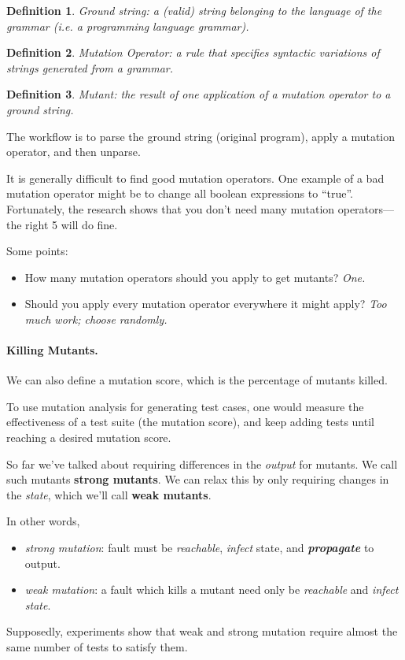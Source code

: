 \documentclass[11pt]{article}
\newtheorem{defn}{Definition}
\begin{document}
\begin{defn}
Ground string: a (valid) string belonging to the language of the grammar (i.e. 
a programming language grammar).
\end{defn}

\begin{defn}
Mutation Operator: a rule that specifies syntactic variations of
strings generated from a grammar.
\end{defn}

\begin{defn}
Mutant: the result of one application of a mutation operator to a 
ground string.
\end{defn}

The workflow is to parse the ground string (original program), apply a
mutation operator, and then unparse.

It is generally difficult to find good mutation operators. One example
of a bad mutation operator might be to change all boolean expressions to
``true''. Fortunately, the research shows that you don't need many
mutation operators---the right 5 will do fine.

Some points:
\begin{itemize}[noitemsep]
\item How many mutation operators should you apply to get mutants? \emph{One.}
\item Should you apply every mutation operator everywhere it might apply? \emph{Too much work; choose randomly.}
\end{itemize}

\paragraph{Killing Mutants.} 
We can also define a mutation score, which is the percentage of mutants killed.

To use mutation analysis for generating test cases, one would measure
the effectiveness of a test suite (the mutation score), and keep adding
tests until reaching a desired mutation score.

So far we've talked about requiring differences in the \emph{output}
for mutants.  We call such mutants {\bf strong mutants}.  We can relax
this by only requiring changes in the \emph{state}, which we'll call
{\bf weak mutants}.

In other words, 
\begin{itemize}[noitemsep]
\item \emph{strong mutation}: fault must be \emph{reachable},
\emph{infect} state, and \emph{\bf propagate} to output.
\item \emph{weak mutation}: a fault which kills a mutant need only be
\emph{reachable} and \emph{infect state}.
\end{itemize}
Supposedly, experiments show that weak and strong mutation require
almost the same number of tests to satisfy them.
\end{document}
